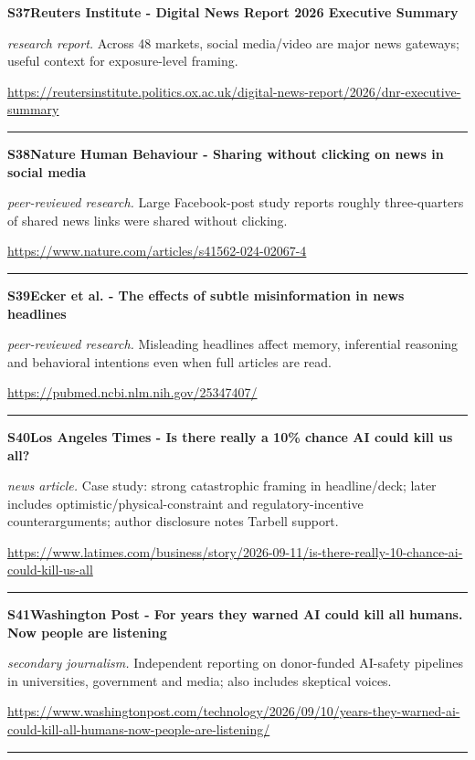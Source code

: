 \hypertarget{src:S37}{}\noindent\textbf{S37}\quad \textbf{Reuters Institute - Digital News Report 2026 Executive Summary}\hfill{}\par
\smallskip
\noindent\textit{research report.} Across 48 markets, social media/video are major news gateways; useful context for exposure-level framing.\par
\noindent\url{https://reutersinstitute.politics.ox.ac.uk/digital-news-report/2026/dnr-executive-summary}\par
\medskip\hrule\medskip

\hypertarget{src:S38}{}\noindent\textbf{S38}\quad \textbf{Nature Human Behaviour - Sharing without clicking on news in social media}\hfill{}\par
\smallskip
\noindent\textit{peer-reviewed research.} Large Facebook-post study reports roughly three-quarters of shared news links were shared without clicking.\par
\noindent\url{https://www.nature.com/articles/s41562-024-02067-4}\par
\medskip\hrule\medskip

\hypertarget{src:S39}{}\noindent\textbf{S39}\quad \textbf{Ecker et al. - The effects of subtle misinformation in news headlines}\hfill{}\par
\smallskip
\noindent\textit{peer-reviewed research.} Misleading headlines affect memory, inferential reasoning and behavioral intentions even when full articles are read.\par
\noindent\url{https://pubmed.ncbi.nlm.nih.gov/25347407/}\par
\medskip\hrule\medskip

\hypertarget{src:S40}{}\noindent\textbf{S40}\quad \textbf{Los Angeles Times - Is there really a 10\% chance AI could kill us all?}\hfill{}\par
\smallskip
\noindent\textit{news article.} Case study: strong catastrophic framing in headline/deck; later includes optimistic/physical-constraint and regulatory-incentive counterarguments; author disclosure notes Tarbell support.\par
\noindent\url{https://www.latimes.com/business/story/2026-09-11/is-there-really-10-chance-ai-could-kill-us-all}\par
\medskip\hrule\medskip

\hypertarget{src:S41}{}\noindent\textbf{S41}\quad \textbf{Washington Post - For years they warned AI could kill all humans. Now people are listening}\hfill{}\par
\smallskip
\noindent\textit{secondary journalism.} Independent reporting on donor-funded AI-safety pipelines in universities, government and media; also includes skeptical voices.\par
\noindent\url{https://www.washingtonpost.com/technology/2026/09/10/years-they-warned-ai-could-kill-all-humans-now-people-are-listening/}\par
\medskip\hrule\medskip

